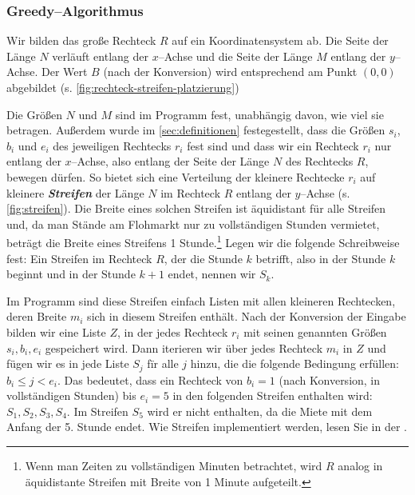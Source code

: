 \subsubsection{Greedy--Algorithmus}\label{sec:greedy}

Wir bilden das große Rechteck $R$ auf ein Koordinatensystem ab.
Die Seite der Länge $N$ verläuft entlang der $x$--Achse und die Seite der Länge
$M$ entlang der $y$--Achse.
Der Wert $B$ (nach der Konversion) wird entsprechend am Punkt $(0, 0)$ abgebildet (s. \cref{fig:rechteck-streifen-platzierung})

Die Größen $N$ und $M$ sind im Programm fest, unabhängig davon, wie viel sie betragen.
Außerdem wurde im \cref{sec:definitionen} festegestellt, dass die Größen $s_i$, $b_i$ und $e_i$
des jeweiligen Rechtecks $r_i$ fest sind und dass wir ein Rechteck $r_i$ nur entlang der $x$--Achse,
also entlang der Seite der Länge $N$ des Rechtecks $R$, bewegen dürfen.
So bietet sich eine Verteilung der kleinere Rechtecke $r_i$ auf kleinere \textit{\textbf{Streifen}}
der Länge $N$ im Rechteck $R$ entlang der $y$--Achse (s. \cref{fig:streifen}).
Die Breite eines solchen Streifen ist äquidistant für alle Streifen und, da
man Stände am Flohmarkt nur zu vollständigen Stunden vermietet, 
beträgt die Breite eines Streifens 1 Stunde.\footnote{Wenn man Zeiten zu
vollständigen Minuten betrachtet,
wird $R$ analog in äquidistante Streifen mit Breite von 1 Minute aufgeteilt.}
Legen wir die folgende Schreibweise fest: Ein Streifen im Rechteck $R$, der die
Stunde $k$ betrifft, also in der Stunde $k$ beginnt und in der Stunde $k+1$ endet, nennen wir $S_k$.


Im Programm sind diese Streifen einfach Listen mit allen kleineren Rechtecken, 
deren Breite $m_i$ sich in diesem Streifen enthält.
Nach der Konversion der Eingabe bilden wir eine Liste $Z$, in der jedes
Rechteck $r_i$ mit seinen genannten Größen $s_i, b_i, e_i$ gespeichert wird.
Dann iterieren wir über jedes Rechteck $m_i$ in $Z$ und fügen wir es in jede Liste $S_j$ fïr alle
$j$ hinzu, die die folgende Bedingung erfüllen: $b_i \leqslant j < e_i$.
Das bedeutet, dass ein Rechteck von $b_i = 1$ (nach Konversion, in vollständigen Stunden)
bis $e_i = 5$ in den folgenden Streifen enthalten wird: $S_1, S_2, S_3, S_4$. Im Streifen $S_5$
wird er nicht enthalten, da die Miete mit dem Anfang der 5. Stunde endet.
Wie Streifen implementiert werden, lesen Sie in der .



